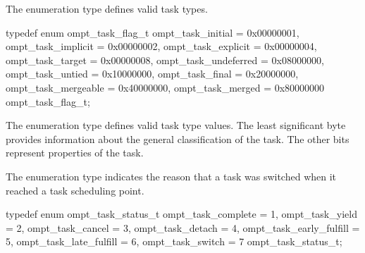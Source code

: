 \label{sec:ompt_task_flag_t}

\summary
The  enumeration type defines valid task types.

\format
\begin{ccppspecific}
\begin{omptEnum}
typedef enum ompt_task_flag_t {
  ompt_task_initial                   = 0x00000001,
  ompt_task_implicit                  = 0x00000002,
  ompt_task_explicit                  = 0x00000004,
  ompt_task_target                    = 0x00000008,
  ompt_task_undeferred                = 0x08000000,
  ompt_task_untied                    = 0x10000000,
  ompt_task_final                     = 0x20000000,
  ompt_task_mergeable                 = 0x40000000,
  ompt_task_merged                    = 0x80000000
} ompt_task_flag_t;
\end{omptEnum}
\end{ccppspecific}

\descr
The  enumeration type defines valid task type values.
The least significant byte provides information about the general classification 
of the task. The other bits represent properties of the task.




\label{sec:ompt_task_status_t}

\summary
The  enumeration type indicates the reason 
that a task was switched when it reached a task scheduling point.

\format
\begin{ccppspecific}
\begin{omptEnum}
typedef enum ompt_task_status_t {
  ompt_task_complete      = 1,
  ompt_task_yield         = 2,
  ompt_task_cancel        = 3,
  ompt_task_detach        = 4,
  ompt_task_early_fulfill = 5,
  ompt_task_late_fulfill  = 6,
  ompt_task_switch        = 7
} ompt_task_status_t;
\end{omptEnum}
\end{ccppspecific}


